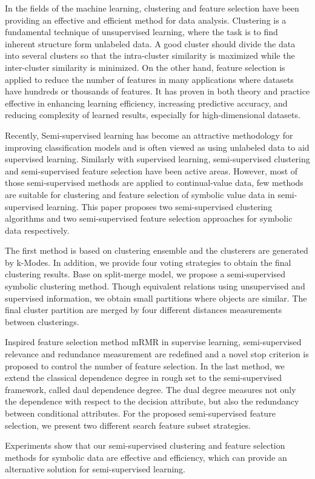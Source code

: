 \begin{englishabstract}


In the fields of the machine learning, clustering and feature selection have been providing an effective and efficient method for data analysis. Clustering is a fundamental technique of unsupervised learning, where the task is to find inherent structure form unlabeled data. A good cluster should divide the data into several clusters so that the intra-cluster similarity is maximized while the inter-cluster similarity is minimized. On the other hand, feature selection is applied to reduce the number of features in many applications where datasets have hundreds or thousands of features. It has proven in both theory and practice effective in enhancing learning efficiency, increasing predictive accuracy, and reducing complexity of learned results, especially for high-dimensional datasets.

Recently, Semi-supervised learning has become an attractive methodology for improving
classification models and is often viewed as using unlabeled data to aid supervised learning. Similarly with supervised learning, semi-supervised clustering and semi-supervised feature selection have been active areas. However, most of those semi-supervised methods are applied to continual-value data, few methods are suitable for clustering and feature selection of symbolic value data in semi-supervised learning. This paper proposes two semi-supervised clustering algorithms and two semi-supervised feature selection approaches for symbolic data respectively.

The first method is based on  clustering ensemble and the clusterers are generated by k-Modes. In addition, we provide four voting strategies to obtain the final clustering results. Base on split-merge model, we propose a semi-supervised symbolic clustering method. Though equivalent relations using unsupervised and supervised information, we obtain small partitions where objects are similar. The final cluster partition are merged by four different distances measurements between clusterings. 

Inspired feature selection method mRMR in supervise learning, semi-supervised relevance and redundance measurement are redefined and a novel stop criterion is proposed to control the number of feature selection. In the last method,  we extend the classical dependence degree in rough set to the semi-supervised framework, called daul dependence degree. The dual degree measures not only the dependence with respect to the decision attribute, but also the redundancy between conditional attributes. For the proposed semi-supervised feature selection, we present two different search
feature subset strategies.

Experiments show that our semi-supervised clustering and feature selection methods for symbolic data are effective and efficiency, which can provide an alternative solution for semi-supervised learning.


\end{englishabstract}
